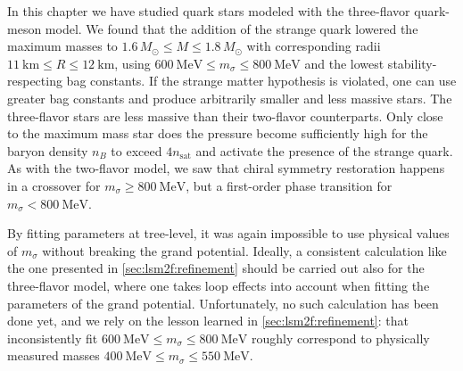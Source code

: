 In this chapter we have studied quark stars modeled with the three-flavor quark-meson model.
We found that the addition of the strange quark lowered the maximum masses to $1.6 \, M_\odot \leq M \leq 1.8 \, M_\odot$
with corresponding radii $\SI{11}{\kilo\meter} \leq R \leq \SI{12}{\kilo\meter}$,
using $\SI{600}{\mega\electronvolt} \leq m_\sigma \leq \SI{800}{\mega\electronvolt}$ and the lowest stability-respecting bag constants.
If the strange matter hypothesis is violated, one can use greater bag constants and produce arbitrarily smaller and less massive stars.
The three-flavor stars are less massive than their two-flavor counterparts.
Only close to the maximum mass star does the pressure become sufficiently high
for the baryon density $n_B$ to exceed $4 n_\text{sat}$
and activate the presence of the strange quark.
As with the two-flavor model, we saw that chiral symmetry restoration happens in a crossover for $m_\sigma \geq \SI{800}{\mega\electronvolt}$,
but a first-order phase transition for $m_\sigma < \SI{800}{\mega\electronvolt}$.

By fitting parameters at tree-level, it was again impossible to use physical values of $m_\sigma$ without breaking the grand potential.
Ideally, a consistent calculation like the one presented in \cref{sec:lsm2f:refinement}
should be carried out also for the three-flavor model,
where one takes loop effects into account when fitting the parameters of the grand potential.
Unfortunately, no such calculation has been done yet,
and we rely on the lesson learned in \cref{sec:lsm2f:refinement}:
that inconsistently fit $\SI{600}{\mega\electronvolt} \leq m_\sigma \leq \SI{800}{\mega\electronvolt}$
roughly correspond to physically measured masses $\SI{400}{\mega\electronvolt} \leq m_\sigma \leq \SI{550}{\mega\electronvolt}$.
